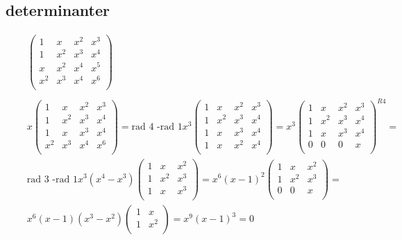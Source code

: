 \subsection{determinanter}
\begin{align*}
  &\quad  
  \left(\begin{array}{cccc}
    1   & x   & x^2 & x^3  \\
    1   & x^2 & x^3 & x^4  \\
    x   & x^2 & x^4 & x^5  \\
    x^2 & x^3 & x^4 & x^6  \\
  \end{array}\right) \\
  &\quad  \\
  &\quad  x
  \left(\begin{array}{cccc}
    1   & x   & x^2 & x^3  \\
    1   & x^2 & x^3 & x^4  \\
    1   & x   & x^3 & x^4  \\
    x^2 & x^3 & x^4 & x^6  \\
  \end{array}\right) = \text{rad 4 -rad 1} x^3  
  \left(\begin{array}{cccc}
    1   & x   & x^2 & x^3  \\
    1   & x^2 & x^3 & x^4  \\
    1   & x   & x^3 & x^4  \\
    1   & x   & x^2 & x^4  \\
  \end{array}\right) =  x^3
  \left(\begin{array}{cccc}
    1   & x   & x^2 & x^3  \\
    1   & x^2 & x^3 & x^4  \\
    1   & x   & x^3 & x^4  \\
    0   & 0   & 0 & x     \\
  \end{array}\right)^{R4} = \\
  &\quad  \text{rad 3 -rad 1} x^3(x^4-x^3)
  \left(\begin{array}{ccc}
    1   & x   & x^2  \\
    1   & x^2 & x^3  \\
    1   & x   & x^3  \\
  \end{array}\right) = x^6(x-1)^2
  \left(\begin{array}{ccc}
    1   & x   & x^2  \\
    1   & x^2 & x^3  \\
    0   & 0   & x  \\
  \end{array}\right) = \\
  &\quad x^6(x-1)(x^3-x^2)  
  \left(\begin{array}{cc}
    1   & x    \\
    1   & x^2  \\
  \end{array}\right) = x^9(x-1)^3=0
\end{align*}

